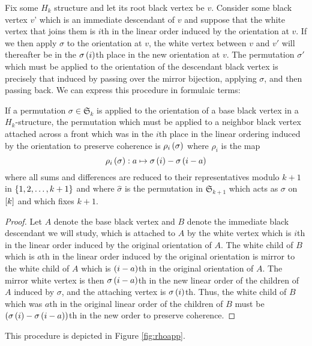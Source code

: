 \documentclass[sectionflow,singlespace,twoside,boldmathhdr]{brandiss} %
\numberwithin{section}{chapter}
\numberwithin{figure}{chapter}
\begin{document}
Fix some $H_{k}$ structure and let its root black vertex be $v$.
Consider some black vertex $v$' which is an immediate descendant of $v$ and suppose that the white vertex that joins them is $i$th in the linear order induced by the orientation at $v$.
If we then apply $\sigma$ to the orientation at $v$, the white vertex between $v$ and $v'$ will thereafter be in the $\sigma \left( {i} \right)$th place in the new orientation at $v$.
The permutation $\sigma'$ which must be applied to the orientation of the descendant black vertex is precisely that induced by passing over the mirror bijection, applying $\sigma$, and then passing back.
We can express this procedure in formulaic terms:
\begin{theorem}
  \label{thm:rhodef}
  If a permutation $\sigma \in \mathfrak{S}_{k}$ is applied to the orientation of a base black vertex in a $H_{k}$-structure, the permutation which must be applied to a neighbor black vertex attached across a front which was in the $i$th place in the linear ordering induced by the orientation to preserve coherence is $\rho_{i} \left( {\sigma} \right)$ where $\rho_{i}$ is the map
  \begin{equation}
    \label{eq:rhodef}
    \rho_{i} \left( {\sigma} \right): a \mapsto \sigma \left( {i} \right) - \sigma \left( {i - a} \right)
  \end{equation}
  where all sums and differences are reduced to their representatives modulo $k+1$ in $\left\{ {1, 2, \dots, k+1} \right\}$ and where $\hat{\sigma}$ is the permutation in $\mathfrak{S}_{k+1}$ which acts as $\sigma$ on $\left[ {k} \right]$ and which fixes $k+1$.
\end{theorem}
\begin{proof}
  Let $A$ denote the base black vertex and $B$ denote the immediate black descendant we will study, which is attached to $A$ by the white vertex which is $i$th in the linear order induced by the original orientation of $A$.
  The white child of $B$ which is $a$th in the linear order induced by the original orientation is mirror to the white child of $A$ which is $\left( {i-a} \right)$th in the original orientation of $A$.
  The mirror white vertex is then $\sigma \left( {i - a} \right)$th in the new linear order of the children of $A$ induced by $\sigma$, and the attaching vertex is $\sigma \left( {i} \right)$th.
  Thus, the white child of $B$ which was $a$th in the original linear order of the children of $B$ must be $\left( {\sigma \left( {i} \right) - \sigma \left( {i-a} \right)} \right)$th in the new order to preserve coherence.
\end{proof}
This procedure is depicted in Figure \ref{fig:rhoapp}.
\end{document}

